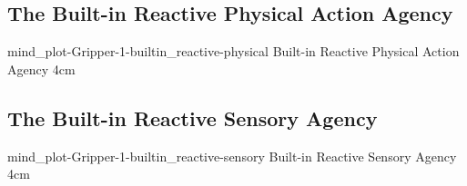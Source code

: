 {\clearpage
  \subsection{The Built-in Reactive Physical Action Agency}
  \experimentcausegroupplots{\dataappendixmaxtime}
                            {\dataappendixexperimentonemaxtime}
                            {\dataappendixexperimenttwomaxtime}
                            {\dataappendixexperimentthreemaxtime}
                            {\dataappendixexperimentonename}
                            {\dataappendixexperimenttwoname}
                            {\dataappendixexperimentthreename}
                            {\dataappendixexperimentoneprettyname}
                            {\dataappendixexperimenttwoprettyname}
                            \experimentcausegroupplotscontinued{\dataappendixexperimentthreeprettyname}
                                                               {mind_plot-Gripper-1-builtin_reactive-physical}
                                                               {Built-in Reactive Physical Action Agency}
                                                               {\experimentdatacommontablereference}
                                                               {4cm}
}
{\clearpage
  \subsection{The Built-in Reactive Sensory Agency}
  \experimentcausegroupplots{\dataappendixmaxtime}
                            {\dataappendixexperimentonemaxtime}
                            {\dataappendixexperimenttwomaxtime}
                            {\dataappendixexperimentthreemaxtime}
                            {\dataappendixexperimentonename}
                            {\dataappendixexperimenttwoname}
                            {\dataappendixexperimentthreename}
                            {\dataappendixexperimentoneprettyname}
                            {\dataappendixexperimenttwoprettyname}
                            \experimentcausegroupplotscontinued{\dataappendixexperimentthreeprettyname}
                                                               {mind_plot-Gripper-1-builtin_reactive-sensory}
                                                               {Built-in Reactive Sensory Agency}
                                                               {\experimentdatacommontablereference}
                                                               {4cm}
}



